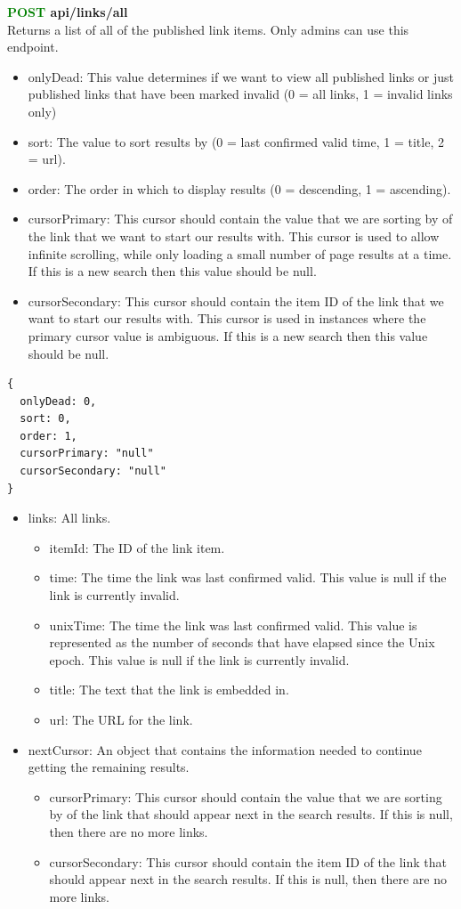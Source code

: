 \documentclass[onecolumn, draftclsnofoot,10pt, compsoc, usenames, dvipsnames]{IEEEtran}
\begin{document}
\noindent
\textbf{\textcolor{Green}{POST} api/links/all} \\
Returns a list of all of the published link items. Only admins can use this endpoint.
\begin{itemize}
    \item onlyDead: This value determines if we want to view all published links or just published links that have been marked invalid (0 = all links, 1 = invalid links only)
    \item sort: The value to sort results by (0 = last confirmed valid time, 1 = title, 2 = url).
    \item order: The order in which to display results (0 = descending, 1 = ascending).
    \item cursorPrimary: This cursor should contain the value that we are sorting by of the link that we want to start our results with. This cursor is used to allow infinite scrolling, while only loading a small number of page results at a time. If this is a new search then this value should be null.
    \item cursorSecondary: This cursor should contain the item ID of the link that we want to start our results with. This cursor is used in instances where the primary cursor value is ambiguous. If this is a new search then this value should be null.
\end{itemize}
\begin{lstlisting}[caption=Example Request Body]
{
  onlyDead: 0,
  sort: 0,
  order: 1,
  cursorPrimary: "null"
  cursorSecondary: "null"
}
\end{lstlisting}
\begin{itemize}
    \item links: All links.
    \begin{itemize}
        \item itemId: The ID of the link item.
        \item time: The time the link was last confirmed valid. This value is null if the link is currently invalid.
        \item unixTime: The time the link was last confirmed valid. This value is represented as the number of seconds that have elapsed since the Unix epoch. This value is null if the link is currently invalid.
        \item title: The text that the link is embedded in.
        \item url: The URL for the link.
    \end{itemize}
    \item nextCursor: An object that contains the information needed to continue getting the remaining results.
    \begin{itemize}
        \item cursorPrimary: This cursor should contain the value that we are sorting by of the link that should appear next in the search results. If this is null, then there are no more links.
        \item cursorSecondary: This cursor should contain the item ID of the link that should appear next in the search results. If this is null, then there are no more links.
    \end{itemize}
\end{itemize}
\end{document}
